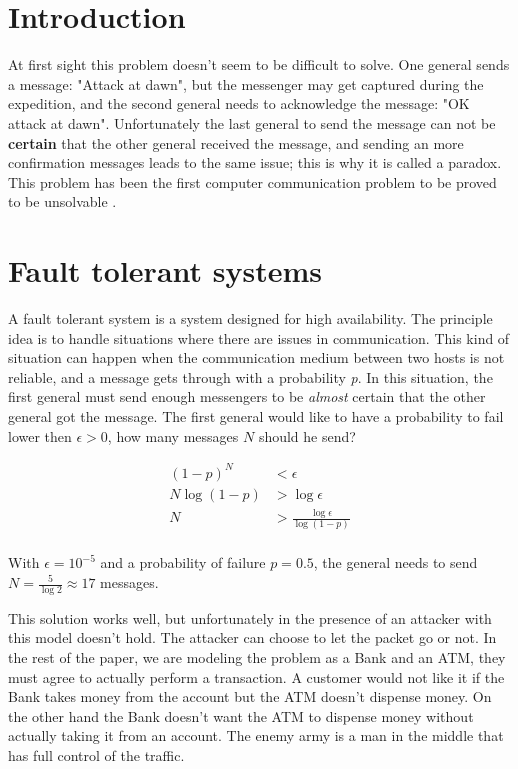\documentclass[10pt,letterpaper]{article}
\begin{document}
\begin{multicols}{2} %

\section{Introduction}

At first sight this problem doesn't seem to be difficult to solve. One general sends a message: "Attack at dawn", but the messenger may get captured during the expedition, and the second general needs to acknowledge the message:
"OK attack at dawn". Unfortunately the last general to send the message can not be \textbf{certain} that the other general received the message, and sending an more confirmation messages leads to the same issue; this is why it is called
a paradox. This problem has been the first computer communication problem to be proved to be unsolvable \cite{Akkoyunlu:1975:CTD:800213.806523}.

\section{Fault tolerant systems}

A fault tolerant system is a system designed for high availability. The principle idea is to handle situations where there are issues in communication. This kind of situation can happen when the communication medium between two hosts is not reliable, and a message gets through with a probability \textit{p}. In this situation, the first general must send enough messengers to
be \textit{almost} certain that the other general got the message. The first general would like to have a probability to fail lower then $\epsilon > 0$, how many messages $N$ should he send?

\begin{align*}
    (1 - p)^{N} &< \epsilon \\
    N \log(1 - p) &> \log \epsilon \\
    N &> \frac{\log \epsilon}{\log (1 - p)}\\
\end{align*}

With $\epsilon = 10^{-5}$ and a probability of failure $p = 0.5$, the general needs to send $N = \frac{5}{\log 2} \approx 17$ messages.

This solution works well, but unfortunately in the presence of an attacker with this model doesn't hold. The attacker can choose to let the packet go or not. In the rest of the paper, we are modeling the problem as a Bank and
an ATM, they must agree to actually perform a transaction. A customer would not like it if the Bank takes money from the account but the ATM doesn't dispense money. On the other hand the Bank doesn't want
the ATM to dispense money without actually taking it from an account. The enemy army is a man in the middle that has full control of the traffic.


\end{multicols}
\end{document}

